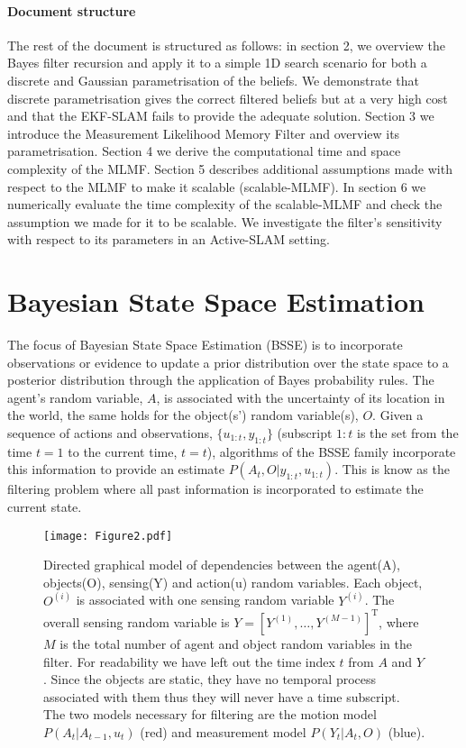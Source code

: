 \documentclass[review]{elsarticle}
\numberwithin{equation}{section}
\begin{document}
\paragraph{Document structure}

The rest of the document is structured as follows: in section 2, we overview the Bayes filter recursion and apply it to a simple 
1D search scenario for both a discrete and Gaussian parametrisation of the beliefs. We demonstrate that discrete parametrisation gives
the correct filtered beliefs but at a very high cost and that the EKF-SLAM fails to provide the adequate solution. Section 3 we 
introduce the Measurement Likelihood Memory Filter and overview its parametrisation. Section 4 we derive the computational time and 
space complexity of the MLMF. Section 5 describes additional assumptions made with respect to the MLMF to make it 
scalable (scalable-MLMF). In section 6 we numerically evaluate the time complexity of the scalable-MLMF and check the assumption we made 
for it to be scalable. We investigate the filter's sensitivity with respect to its parameters in an Active-SLAM setting.



\section{Bayesian State Space Estimation}

The focus of Bayesian State Space Estimation (BSSE) is to incorporate observations or evidence to update a prior distribution over
the state space to a posterior distribution through the application of Bayes probability rules. The agent's random variable, $A$, 
is associated with the uncertainty of its location in the world, the same holds for the object(s') random variable(s), $O$. 
Given a sequence of actions and observations, $\{u_{1:t},y_{1:t}\}$ (subscript $1:t$ is the set from the time $t=1$ to the current time, $t=t$), 
algorithms of the BSSE family incorporate this information to provide an estimate $P(A_t,O|y_{1:t},u_{1:t})$. This is know as the 
filtering problem where all past information is incorporated to estimate the current state.  

\begin{figure}
\centering
\texttt{[image: Figure2.pdf]}
\caption{Directed graphical model of dependencies between the agent(A), objects(O), sensing(Y) and action(u) random variables. Each 
object, $O^{(i)}$ is associated with one sensing random variable $Y^{(i)}$. The overall sensing random variable is $Y = \left[Y^{(1)},\dots,Y^{(M-1)}\right]^{\mathrm{T}}$,
where $M$ is the total number of agent and object random variables in the filter. 
For readability we have left out the time index $t$ from $A$ and $Y$. Since the objects are static, they have no temporal process associated with 
them thus they will never have a time subscript. The two models necessary for filtering are the motion model $P(A_t|A_{t-1},u_t)$ (red) and measurement model
$P(Y_t|A_t,O)$ (blue).}
\label{fig:bayesian_sse_dag}
\end{figure}
\end{document}

